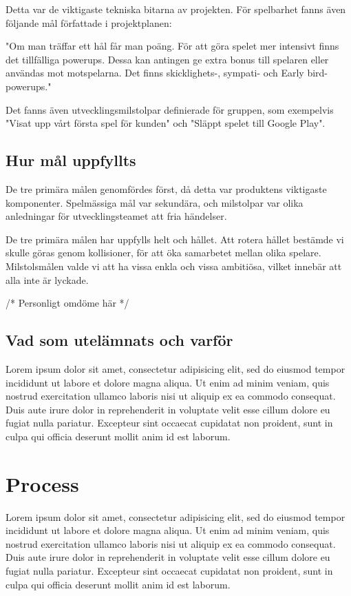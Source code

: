 \documentclass[a4paper,12pt,oneside,final]{extbook}
\begin{document}
Detta var de viktigaste tekniska bitarna av projekten. För spelbarhet fanns även följande mål författade i projektplanen:

"Om man träffar ett hål får man poäng. För att göra spelet mer intensivt finns det tillfälliga powerups. Dessa kan antingen ge extra bonus till spelaren eller användas mot motspelarna. Det finns skicklighets-, sympati- och Early bird-powerups."

Det fanns även utvecklingsmilstolpar definierade för gruppen, som exempelvis "Visat upp vårt första spel för kunden" och "Släppt spelet till Google Play".

\subsection{Hur mål uppfyllts}

De tre primära målen genomfördes först, då detta var produktens viktigaste komponenter. Spelmässiga mål var sekundära, och milstolpar var olika anledningar för utvecklingsteamet att fria händelser. 

De tre primära målen har uppfylls helt och hållet. Att rotera hållet bestämde vi skulle göras genom kollisioner, för att öka samarbetet mellan olika spelare. Milstolsmålen valde vi att ha vissa enkla och vissa ambitiösa, vilket innebär att alla inte är lyckade.

/* Personligt omdöme här */

\subsection{Vad som utelämnats och varför}

Lorem ipsum dolor sit amet, consectetur adipisicing elit, sed do eiusmod tempor incididunt ut labore et dolore magna aliqua. Ut enim ad minim veniam, quis nostrud exercitation ullamco laboris nisi ut aliquip ex ea commodo consequat. Duis aute irure dolor in reprehenderit in voluptate velit esse cillum dolore eu fugiat nulla pariatur. Excepteur sint occaecat cupidatat non proident, sunt in culpa qui officia deserunt mollit anim id est laborum.

\section{Process}

Lorem ipsum dolor sit amet, consectetur adipisicing elit, sed do eiusmod tempor incididunt ut labore et dolore magna aliqua. Ut enim ad minim veniam, quis nostrud exercitation ullamco laboris nisi ut aliquip ex ea commodo consequat. Duis aute irure dolor in reprehenderit in voluptate velit esse cillum dolore eu fugiat nulla pariatur. Excepteur sint occaecat cupidatat non proident, sunt in culpa qui officia deserunt mollit anim id est laborum.
\end{document}

